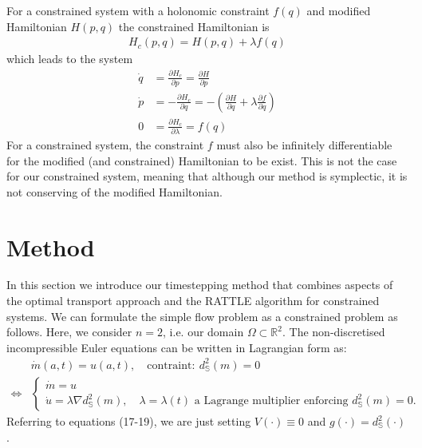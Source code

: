 \documentclass[11pt, oneside]{article}   	%
\newcommand{\R}{\mathbb{R}}
\newcommand{\dsmsq}{d^{2}_{\mathbb{S}}(m)}
\newcommand{\graddsmsq}{\nabla{d^{2}_{\mathbb{S}}(m)}}
\newcommand{\Sb}{\mathbb{S}}
\begin{document}
For a constrained system with a holonomic constraint \(f(q)\) and modified Hamiltonian \(H(p, q)\) the constrained Hamiltonian is
\begin{align}
H_c(p, q) = H(p, q) + \lambda f(q)
\end{align}
which leads to the system
\begin{align}
\dot{q} &= \frac{\partial H_c}{\partial p} = \frac{\partial H}{\partial p} \\
\dot{p} &= - \frac{\partial H_c}{\partial q} = - (\frac{\partial H}{\partial q} + \lambda \frac{\partial f}{\partial q})\\
0 &= \frac{\partial H_c}{\partial \lambda} = f(q)
\end{align}
For a constrained system, the constraint \(f\) must also be infinitely differentiable for the modified (and constrained) Hamiltonian to be exist. This is not the case for our constrained system, meaning that although our method is symplectic, it is not conserving of the modified Hamiltonian.


\section{Method}

In this section we introduce our timestepping method that combines aspects of the optimal transport approach and the RATTLE algorithm for constrained systems. We can formulate the simple flow problem as a constrained problem as follows. Here, we consider \(n=2\), i.e. our domain \(\Omega \subset \R^2\). The non-discretised incompressible Euler equations can be written in Lagrangian form as:
\begin{align}
& \dot{m}(a, t) = u(a,t), \quad \text{contraint}: \: \dsmsq = 0 \\
\iff
 &\begin{cases}
  \dot{m} = u \\
  \dot{u} = \lambda \graddsmsq, \quad \lambda = \lambda(t) \text{ a Lagrange multiplier enforcing } \dsmsq = 0.
 \end{cases} 
\end{align}
Referring to equations (17-19), we are just setting \(V(\cdot) \equiv 0\) and \(g(\cdot) = d^2_{\Sb}(\cdot)\).
\end{document}
